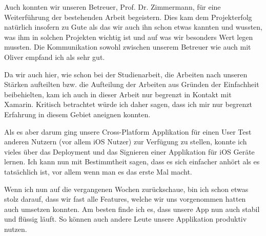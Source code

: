 Auch konnten wir unseren Betreuer, Prof. Dr. Zimmermann, für eine Weiterführung der bestehenden Arbeit begeistern. Dies kam dem Projekterfolg natürlich insofern zu Gute als das wir auch ihn schon etwas kannten und wussten, was ihm in solchen Projekten wichtig ist und auf was wir besonders Wert legen mussten. Die Kommunikation sowohl zwischen unserem Betreuer wie auch mit Oliver empfand ich als sehr gut.

Da wir auch hier, wie schon bei der Studienarbeit, die Arbeiten nach unseren Stärken aufteilten bzw. die Aufteilung der Arbeiten aus Gründen der Einfachheit beibehielten, kam ich auch in dieser Arbeit nur begrenzt in Kontakt mit Xamarin. Kritisch betrachtet würde ich daher sagen, dass ich mir nur begrenzt Erfahrung in diesem Gebiet aneignen konnten. 

Als es aber darum ging unsere Cross-Platform Applikation für einen User Test anderen Nutzern (vor allem iOS Nutzer) zur Verfügung zu stellen, konnte ich vieles über das Deployment und das Signieren einer Applikation für iOS Geräte lernen. Ich kann nun mit Bestimmtheit sagen, dass es sich einfacher anhört als es tatsächlich ist, vor allem wenn man es das erste Mal macht.

Wenn ich nun auf die vergangenen Wochen zurückschaue, bin ich schon etwas stolz darauf, dass wir fast alle Features, welche wir uns vorgenommen hatten auch umsetzen konnten. Am besten finde ich es, dass unsere App nun auch stabil und flüssig läuft. So können auch andere Leute unsere Applikation produktiv nutzen.
 